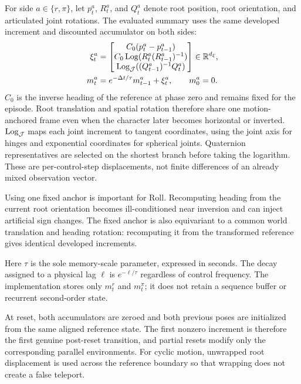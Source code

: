 For side $a\in\{r,\pi\}$, let $p_t^a$, $R_t^a$, and $Q_t^a$ denote root
position, root orientation, and articulated joint rotations.  The evaluated
summary uses the same developed increment and discounted accumulator on both
sides:
\begin{equation}
 \begin{aligned}
 \xi_t^a&=
 \begin{bmatrix}
 C_0(p_t^a-p_{t-1}^a)\\
 C_0\operatorname{Log}(R_t^a(R_{t-1}^a)^{-1})\\
 \operatorname{Log}_{\mathcal J}((Q_{t-1}^a)^{-1}Q_t^a)
 \end{bmatrix}\in\mathbb{R}^{d_\xi},\\
 m_t^a&=e^{-\Delta t/\tau}m_{t-1}^a+\xi_t^a,
 \qquad m_0^a=0.
 \end{aligned}
 \label{eq:motion-summary}
\end{equation}
$C_0$ is the inverse heading of the reference at phase zero and remains fixed
for the episode.  Root translation and spatial rotation therefore share one
motion-anchored frame even when the character later becomes horizontal or
inverted.  $\operatorname{Log}_{\mathcal J}$ maps each joint increment to tangent
coordinates, using the joint axis for hinges and exponential coordinates for
spherical joints.  Quaternion representatives are selected on the shortest
branch before taking the logarithm.  These are per-control-step displacements,
not finite differences of an already mixed observation vector.

Using one fixed anchor is important for Roll.  Recomputing heading from the
current root orientation becomes ill-conditioned near inversion and can
inject artificial sign changes.  The fixed anchor is also equivariant to a
common world translation and heading rotation: recomputing it from the
transformed reference gives identical developed increments.

Here $\tau$ is the sole memory-scale parameter, expressed in seconds.  The
decay assigned to a physical lag $\ell$ is $e^{-\ell/\tau}$ regardless of
control frequency.
The implementation stores only $m_t^r$ and $m_t^\pi$; it does not retain a
sequence buffer or recurrent second-order state.

At reset, both accumulators are zeroed and both previous poses are initialized
from the same aligned reference state.  The first nonzero increment is
therefore the first genuine post-reset transition, and partial resets modify
only the corresponding parallel environments.  For cyclic motion, unwrapped
root displacement is used across the reference boundary so that wrapping does
not create a false teleport.

